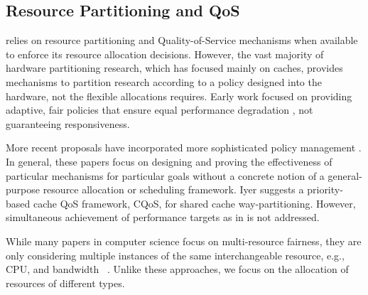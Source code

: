 \subsection{Resource Partitioning and QoS}
\label{sec:rel:pm}

%
\pacora relies on resource partitioning and Quality-of-Service mechanisms when available to enforce its resource allocation decisions.  However, the vast majority of hardware partitioning research, which has focused mainly on caches, provides mechanisms to partition research according to a policy designed into the hardware, not the flexible allocations \pacora requires.  Early work focused on providing adaptive, fair policies that ensure equal performance degradation \cite{605420,1086328}, not guaranteeing responsiveness.

More recent proposals have incorporated more sophisticated policy management \cite{1241608,1331730,1152161,1254886}. In general, these papers focus on designing and proving the effectiveness of particular mechanisms for particular goals \cite{876484, 967444,1194855,1275005,1194858,1318096,1088154,1399973,1069998,1399982} without a concrete notion of a general-purpose resource allocation or scheduling framework. 
Iyer\cite{1006246} suggests a priority-based cache QoS framework, CQoS, for shared cache way-partitioning. 
However, simultaneous achievement of performance targets as in \pacora is not addressed.

While many papers in computer science focus on
multi-resource fairness, they are only considering multiple instances of the same interchangeable resource, e.g.,
CPU\cite{Baruah96proportionateprogress, Baruah_fastscheduling, Zhu}, and bandwidth ~\cite{Blanquer, Kleinberg99fairnessin, Liu}. Unlike these
approaches, we focus on the allocation of resources of
different types.




